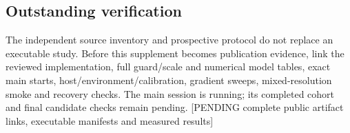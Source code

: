 \subsection{Outstanding verification}

The independent source inventory and prospective protocol do not replace
an executable study. Before this supplement becomes publication evidence,
link the reviewed implementation, full guard/scale and numerical model
tables, exact main starts, host/environment/calibration, gradient sweeps,
mixed-resolution smoke and recovery checks. The main session is running;
its completed cohort and final candidate checks remain pending.
[PENDING complete public artifact links, executable manifests and measured results]
